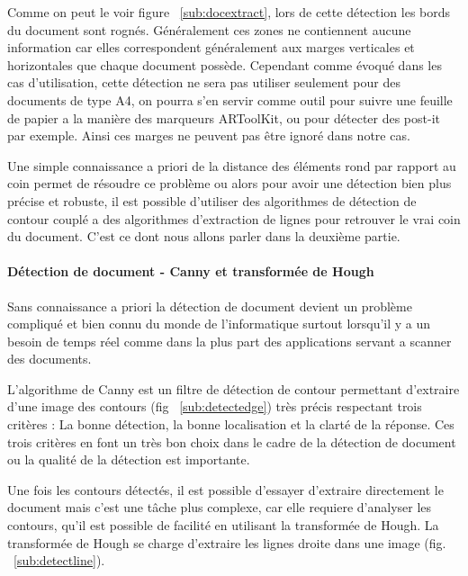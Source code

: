 Comme on peut le voir figure ~\ref{sub:docextract}, lors de cette détection les bords du document sont rognés. Généralement ces zones ne contiennent aucune information car elles correspondent généralement aux marges verticales et horizontales que chaque document possède. Cependant comme évoqué dans les cas d'utilisation, cette détection ne sera pas utiliser seulement pour des documents de type A4, on pourra s'en servir comme outil pour suivre une feuille de papier a la manière des marqueurs ARToolKit, ou pour détecter des post-it par exemple. Ainsi ces marges ne peuvent pas être ignoré dans notre cas.

Une simple connaissance a priori de la distance des éléments rond par rapport au coin permet de résoudre ce problème ou alors pour avoir une détection bien plus précise et robuste, il est possible d'utiliser des algorithmes de détection de contour couplé a des algorithmes d'extraction de lignes pour retrouver le vrai coin du document. C'est ce dont nous allons parler dans la deuxième partie.

\paragraph{Détection de document - Canny et transformée de Hough} Sans connaissance a priori la détection de document devient un problème compliqué et bien connu du monde de l'informatique surtout lorsqu'il y a un besoin de temps réel comme dans la plus part des applications servant a scanner des documents.

L'algorithme de Canny\cite{Canny86acomputational} est un filtre de détection de contour permettant d'extraire d'une image des contours (fig ~\ref{sub:detectedge}) très précis respectant trois critères : La bonne détection, la bonne localisation et la clarté de la réponse. Ces trois critères en font un très bon choix dans le cadre de la détection de document ou la qualité de la détection est importante.

Une fois les contours détectés, il est possible d'essayer d'extraire directement le document mais c'est une tâche plus complexe, car elle requiere d'analyser les contours, qu'il est possible de facilité en utilisant la transformée de Hough\cite{hough}. La transformée de Hough se charge d'extraire les lignes droite dans une image (fig. ~\ref{sub:detectline}).

